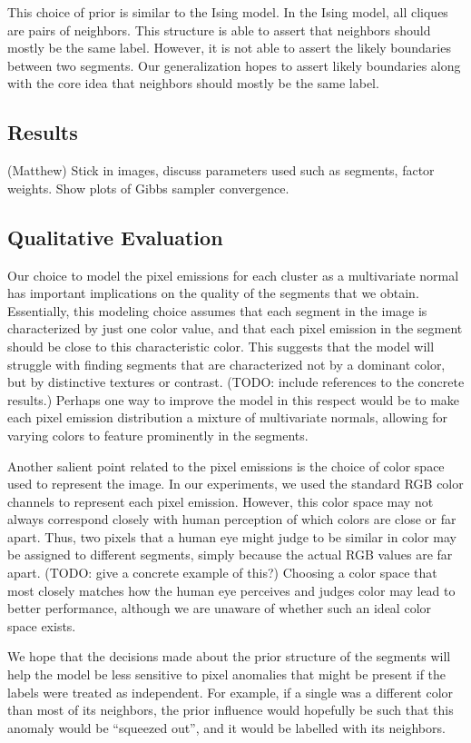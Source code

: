\documentclass[12pt]{article}
\begin{document}
This choice of prior is similar to the Ising model. In the Ising model, all
cliques are pairs of neighbors. This structure is able to assert that neighbors
should mostly be the same label. However, it is not able to assert the likely
boundaries between two segments. Our generalization hopes to assert likely
boundaries along with the core idea that neighbors should mostly be the same
label.

\subsection*{Results}(Matthew)
Stick in images, discuss parameters used such as segments, factor weights.
Show plots of Gibbs sampler convergence.


\subsection*{Qualitative Evaluation}
Our choice to model the pixel emissions for each cluster as a multivariate normal has important
implications on the quality of the segments that we obtain.
Essentially, this modeling choice assumes that each segment in the image is characterized by just one
color value, and that each pixel emission in the segment should be close to this characteristic
color. This suggests that the model will struggle with finding segments that are characterized
not by a dominant color, but by distinctive textures or contrast. (TODO: include references to
the concrete results.) Perhaps one way to improve the model in this respect would be to make each
pixel emission distribution a mixture of multivariate normals, allowing for varying colors to feature
prominently in the segments.

Another salient point related to the pixel emissions is the choice of color space used to represent
the image.
In our experiments, we used the standard RGB color channels to represent each pixel emission.
However, this color space may not always correspond closely with human perception of which colors are
close or far apart.
Thus, two pixels that a human eye might judge to be similar in color may be assigned to different
segments, simply because the actual RGB values are far apart. (TODO: give a concrete example of this?)
Choosing a color space that most closely matches how the human eye perceives and judges color may
lead to better performance, although we are unaware of whether such an ideal color space exists.

We hope that the decisions made about the prior structure of the segments will
help the model be less sensitive to pixel anomalies that might be present if
the labels were treated as independent. For example, if a single was a
different color than most of its neighbors, the prior influence would hopefully
be such that this anomaly would be ``squeezed out'', and it would be labelled
with its neighbors.
\end{document}
